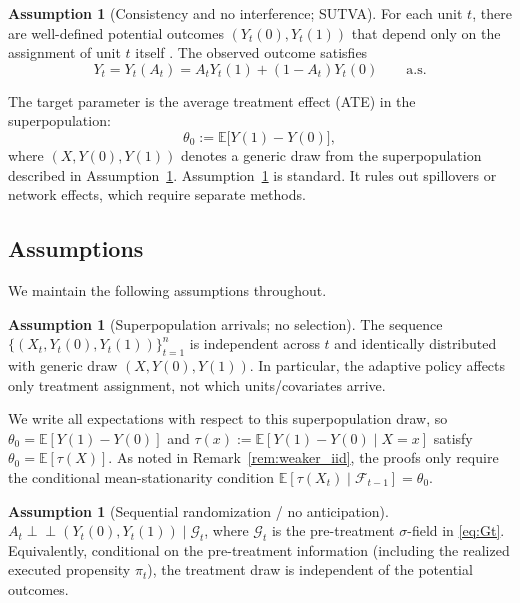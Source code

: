 \documentclass[11pt]{article}
\numberwithin{equation}{section}
\theoremstyle{plain}
\theoremstyle{definition}
\newtheorem{assumption}[theorem]{Assumption}
\theoremstyle{remark}
\newcommand{\E}{\mathbb{E}}
\newcommand{\indep}{\mathrel{\perp\!\!\!\perp}}
\newcommand{\cF}{\mathcal{F}}
\newcommand{\cG}{\mathcal{G}}
\begin{document}
\begin{assumption}[Consistency and no interference; SUTVA]\label{ass:sutva}
For each unit $t$, there are well-defined potential outcomes $(Y_t(0),Y_t(1))$ that depend only on the assignment of unit $t$ itself \citep[see][]{rubin1980comment}. The observed outcome satisfies
\[
Y_t = Y_t(A_t) = A_t Y_t(1) + (1-A_t)Y_t(0)\qquad\text{a.s.}
\]
\end{assumption}

The target parameter is the average treatment effect (ATE) in the superpopulation:
\begin{equation}\label{eq:theta0}
\theta_0 := \E\big[ Y(1)-Y(0)\big],
\end{equation}
where $(X,Y(0),Y(1))$ denotes a generic draw from the superpopulation described in Assumption~\ref{ass:iid}. Assumption~\ref{ass:sutva} is standard. It rules out spillovers or network effects, which require separate methods.

\subsection{Assumptions}\label{sec:assumptions}

We maintain the following assumptions throughout.

\begin{assumption}[Superpopulation arrivals; no selection]\label{ass:iid}
The sequence $\{(X_t,Y_t(0),Y_t(1))\}_{t=1}^n$ is independent across $t$ and identically distributed with generic draw $(X,Y(0),Y(1))$. In particular, the adaptive policy affects only treatment assignment, not which units/covariates arrive.
\end{assumption}

\noindent
We write all expectations with respect to this superpopulation draw, so $\theta_0=\E[Y(1)-Y(0)]$ and $\tau(x):=\E[Y(1)-Y(0)\mid X=x]$ satisfy $\theta_0=\E[\tau(X)]$. As noted in Remark~\ref{rem:weaker_iid}, the proofs only require the conditional mean-stationarity condition $\E[\tau(X_t)\mid \cF_{t-1}]=\theta_0$.

\begin{assumption}[Sequential randomization / no anticipation]\label{ass:unconf}\label{ass:seq_rand}
$A_t \indep (Y_t(0),Y_t(1))\mid \cG_t$, where $\cG_t$ is the pre-treatment $\sigma$-field in \eqref{eq:Gt}. Equivalently, conditional on the pre-treatment information (including the realized executed propensity $\pi_t$), the treatment draw is independent of the potential outcomes.
\end{assumption}
\end{document}
